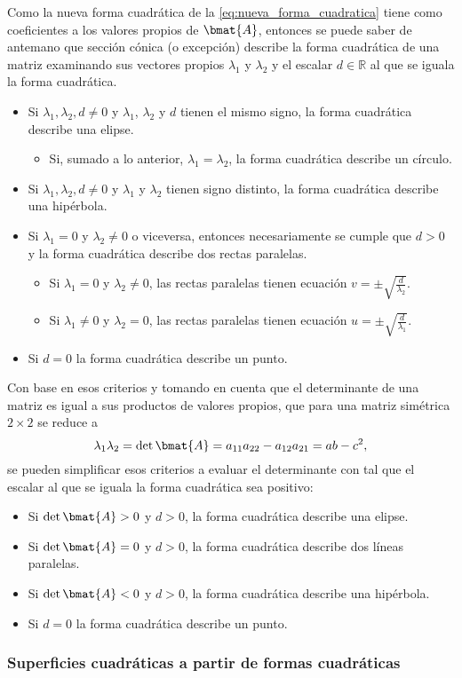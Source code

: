 \documentclass{fmbnotes}
\begin{document}
Como la nueva forma cuadrática de la \autoref{eq:nueva_forma_cuadratica} tiene como coeficientes a los valores propios de \(\bmat{A}\), entonces se puede saber de antemano que sección cónica (o excepción) describe la forma cuadrática de una matriz examinando sus vectores propios \(\lambda_1\) y \(\lambda_2\) y el escalar \(d\in\mathbb{R}\) al que se iguala la forma cuadrática.
\begin{itemize}
	\item Si \(\lambda_1,\lambda_2,d \neq 0\) y \(\lambda_1\), \(\lambda_2\) y \(d\) tienen el mismo signo, la forma cuadrática describe una elipse.
	\begin{itemize}
		\item Si, sumado a lo anterior, \(\lambda_1=\lambda_2\), la forma cuadrática describe un círculo.
	\end{itemize}
	\item Si \(\lambda_1,\lambda_2,d \neq 0\) y \(\lambda_1\) y \(\lambda_2\) tienen signo distinto, la forma cuadrática describe una hipérbola.
	\item Si \(\lambda_1 = 0\) y \(\lambda_2\neq0\) o viceversa, entonces necesariamente se cumple que \(d > 0\) y la forma cuadrática describe dos rectas paralelas.
		\begin{itemize}
			\item Si \(\lambda_1 = 0\) y \(\lambda_2\neq0\), las rectas paralelas tienen ecuación \(v = \pm \sqrt{\frac{d}{\lambda_2}}\).
			\item Si \(\lambda_1 \neq 0\) y \(\lambda_2=0\), las rectas paralelas tienen ecuación \(u = \pm \sqrt{\frac{d}{\lambda_1}}\).
		\end{itemize}
	\item Si \(d=0\) la forma cuadrática describe un punto.
\end{itemize}

Con base en esos criterios y tomando en cuenta que el determinante de una matriz es igual a sus productos de valores propios, que para una matriz simétrica \(2 \times 2\) se reduce a \[\lambda_1\lambda_2=\det \bmat{A} = a_{11}a_{22}-a_{12}a_{21} = ab-c^2,\]
se pueden simplificar esos criterios a evaluar el determinante con tal que el escalar al que se iguala la forma cuadrática sea positivo:
\begin{itemize}
	\item Si \(\det \bmat{A} > 0\) y \(d>0\), la forma cuadrática describe una elipse.
	\item Si \(\det \bmat{A} = 0\) y \(d>0\), la forma cuadrática describe dos líneas paralelas.
	\item Si \(\det \bmat{A} < 0\) y \(d>0\), la forma cuadrática describe una hipérbola.
	\item Si \(d=0\) la forma cuadrática describe un punto.
\end{itemize}

\subsubsection{Superficies cuadráticas a partir de formas cuadráticas}
\end{document}
